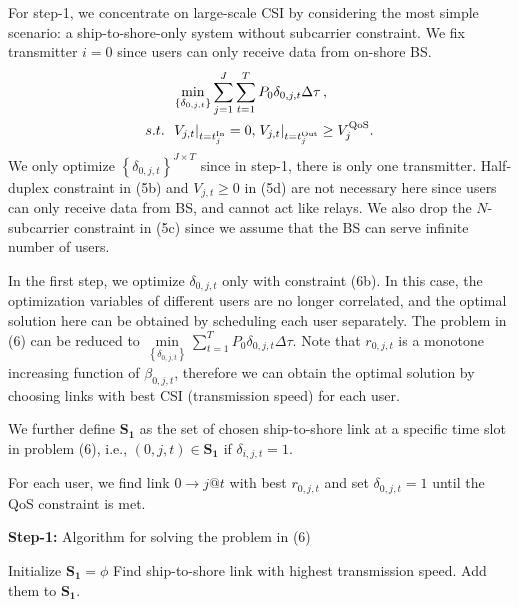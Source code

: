 \documentclass[journal]{IEEEtran}
\begin{document}
 
 For step-1, we concentrate on large-scale CSI by considering the most simple scenario: a ship-to-shore-only system without subcarrier constraint. We fix transmitter $i = 0$ since users can only receive data from on-shore BS. 
 \begin{subequations}
 \begin{align}
 & \mathop {\min }\limits_{\left\{ {{\delta _{0,j,t}}} \right\}}  {\sum\limits_{j = 1}^J {\sum\limits_{t = 1}^{T} {{P_{0}}\delta _{0,j,t} \Delta \tau } \,} }  ,\\
  {s.t.} \;\; &{{{\left. {{V_{j,t}}} \right|}_{t = t_j^{{\rm{In}}}}} = 0,\left. { {V_{j,t}}} \right|_{t = t_j^{{\rm{Out}}}}} \ge V_j^{\rm{QoS}}.
 \end{align}
 \end{subequations}
 We only optimize $\left\{ {{\delta _{0,j,t}}} \right\}^{J \times T}$ since in step-1, there is only one transmitter. 
 Half-duplex constraint in (5b) and ${V_{j,t}} \ge 0$ in (5d) are not necessary here since users can only receive data from BS, and cannot act like relays. We also drop the $N$-subcarrier constraint in (5c) since we assume that the BS can serve infinite number of users. 
 
 In the first step, we optimize ${\delta _{0,j,t}}$ only with constraint (6b). In this case, the optimization variables of different users are no longer correlated, and the optimal solution here can be obtained by scheduling each user separately. The problem in (6) can be reduced to $\mathop {\min }\limits_{{\left\{ {{\delta _{0,j,t}}} \right\}}} {\sum\limits_{t = 1}^T {{P_{0}}\delta _{0,j,t} \Delta \tau } } $. Note that ${r_{0,j,t}}$ is a monotone increasing function of ${\beta _{0,j,t}}$, therefore we can obtain the optimal solution by choosing links with best CSI (transmission speed) for each user. 
 
 We further define ${{\mathbf{S}}_{\mathbf{1}}}$ as the set of chosen ship-to-shore link at a specific time slot in problem (6), i.e., $\left( {0,j,t} \right) \in {\mathbf{S}}_{\mathbf{1}}$ if ${\delta _{i,j,t} = 1}$. 
 
 For each user, we find link $0 \to j@t$ with best ${r _{0,j,t}}$ and set ${\delta _{0,j,t} = 1}$ until the QoS constraint is met.
 
 \begin{algorithm}[ht]
  \caption{\textbf{Step-1:} Algorithm for solving the problem in (6)}
  \begin{algorithmic}[1]
  \STATE Initialize ${{\mathbf{S}}_{\mathbf{1}}}=\phi$
    \STATE Find ship-to-shore link with highest transmission speed. 
    \STATE Add them to ${{\mathbf{S}}_{\mathbf{1}}}$.
    \ENDWHILE
  \ENDFOR
 \end{algorithmic}
 \end{algorithm}
\end{document}
